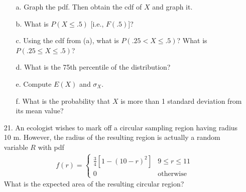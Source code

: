 \documentclass[letterpaper,12pt]{article}
\begin{document}
\begin{enumerate}
\begin{enumerate}
      \item[a.]
        Graph the pdf. Then obtain the cdf of $X$ and graph it.
      \item[b.]
        What is $P(X \le .5)$ [i.e., $F(.5)$]?
      \item[c.]
        Using the cdf from (a), what is $P(.25 < X \le .5)$? What is $P(.25 \le X \le .5)$?
      \item[d.]
        What is the 75th percentile of the distribution?
      \item[e.]
        Compute $E(X)$ and $\sigma_X$.
      \item[f.]
        What is the probability that $X$ is more than 1 standard deviation from its mean value?
    \end{enumerate}
  \item[21.]
    An ecologist wishes to mark off a circular sampling region having radius 10 m. However, the radius of the resulting region is actually a random variable $R$ with pdf
    \begin{align*}
      f(r) = \begin{cases}
        \frac{3}{4}[1 - (10 - r)^2] & 9 \le r \le 11 \\
        0                           & \text{otherwise}
      \end{cases}
    \end{align*}
    What is the expected area of the resulting circular region?
\end{enumerate}
\end{document}

